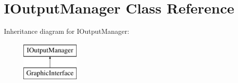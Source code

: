\hypertarget{class_i_output_manager}{}\section{I\+Output\+Manager Class Reference}
\label{class_i_output_manager}
Inheritance diagram for I\+Output\+Manager\+:\begin{figure}[H]
\begin{center}
\leavevmode
\includegraphics[height=2.000000cm]{class_i_output_manager}
\end{center}
\end{figure}
